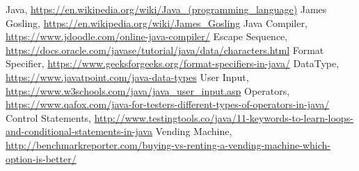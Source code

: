 \documentclass[A4 paper,openany]{book}  %
\begin{document}
% 
% 
\printindex
% 
% 
\begin{thebibliography}{90}
    \footnotesize
     Java, \url{https://en.wikipedia.org/wiki/Java_(programming_language)}
     James Gosling, \url{https://en.wikipedia.org/wiki/James_Gosling}
     Java Compiler, \url{https://www.jdoodle.com/online-java-compiler/}
     Escape Sequence, \url{https://docs.oracle.com/javase/tutorial/java/data/characters.html}
     Format Specifier,  \footnotesize{\url{https://www.geeksforgeeks.org/format-specifiers-in-java/}}
     DataType, \url{https://www.javatpoint.com/java-data-types}
     User Input, \url{https://www.w3schools.com/java/java_user_input.asp}
     Operators, \url{https://www.qafox.com/java-for-testers-different-types-of-operators-in-java/}
     Control Statements, \url{http://www.testingtools.co/java/11-keywords-to-learn-loops-and-conditional-statements-in-java}
     Vending Machine, \url{http://benchmarkreporter.com/buying-vs-renting-a-vending-machine-which-option-is-better/}
\end{thebibliography}









\end{document}
